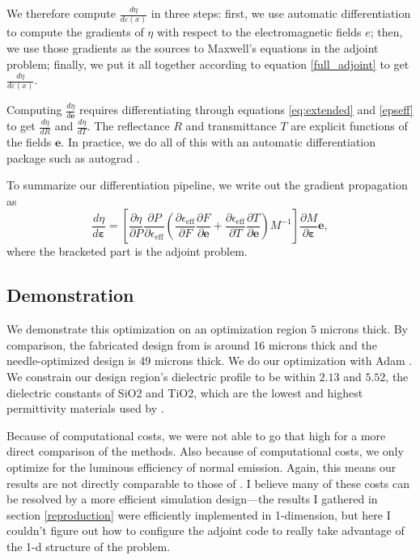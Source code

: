 \documentclass[%
 reprint,
 amsmath,amssymb,
 aps
]{revtex4-2}
\begin{document}
We therefore compute $\frac{d \eta}{d\varepsilon(x)}$ in three steps: first, we use automatic differentiation to compute the gradients of $\eta$ with respect to the electromagnetic fields $e$; then, we use those gradients as the sources to Maxwell's equations in the adjoint problem; finally, we put it all together according to equation \ref{full_adjoint} to get $\frac{d  \eta}{d\varepsilon(x)}$.

Computing $\frac{d\eta}{d \pmb{e}}$ requires differentiating through equations \ref{eq:extended} and \ref{epseff} to get $\frac{d\eta}{d R}$ and $\frac{d\eta}{dT}$. The reflectance $R$ and transmittance $T$ are explicit functions of the fields $\pmb{e}$. In practice, we do all of this with an automatic differentiation package such as autograd \cite{autograd}. 

To summarize our differentiation pipeline, we write out the gradient propagation as \begin{equation}
    \label{full pipeline}
    \boxed{\frac{d \eta}{d \pmb{\varepsilon}} = \left [\frac{\partial \eta}{\partial P}\frac{\partial P}{\partial \epsilon_{\text{eff}}}\left (\frac{\partial \epsilon_{\text{eff}}}{\partial F} \frac{\partial F}{\partial \pmb{e}} + \frac{\partial \epsilon_{\text{eff}}}{\partial T}\frac{\partial T}{\partial \pmb{e}}\right )M^{-1}\right ]\frac{\partial M}{\partial \pmb{\varepsilon}} \pmb{e}},
\end{equation}
where the bracketed part is the adjoint problem.
\subsection{Demonstration}
We demonstrate this optimization on an optimization region $5$ microns thick. By comparison, the fabricated design from \cite{ilic} is around 16 microns thick and the needle-optimized design is 49 microns thick. We do our optimization with Adam \cite{adam}. We constrain our design region's dielectric profile to be within $2.13$ and $5.52$, the dielectric constants of SiO2 and TiO2, which are the lowest and highest permittivity materials used by \cite{ilic}. 

Because of computational costs, we were not able to go that high for a more direct comparison of the methods. Also because of computational costs, we only optimize for the luminous efficiency of normal emission. Again, this means our results are not directly comparable to those of \cite{ilic}. I believe many of these costs can be resolved by a more efficient simulation design---the results I gathered in section \ref{reproduction} were efficiently implemented in 1-dimension, but here I couldn't figure out how to configure the adjoint code to really take advantage of the 1-d structure of the problem.
\end{document}
